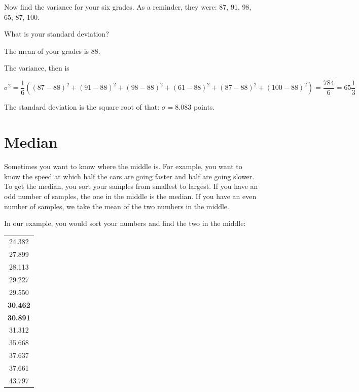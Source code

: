 \begin{Exercise}[title={Variance of Grades}, label=grades_variance]

  Now find the variance for your six grades. As a reminder, they were: 87, 91, 98, 65, 87, 100.

  What is your standard deviation?

\end{Exercise}
\begin{Answer}[ref=grades_variance]

  The mean of your grades is $88$.

  The variance, then is

  $$\sigma^2 = \frac{1}{6} \left((87 - 88)^2 + (91 - 88)^2 + (98 - 88)^2 + (61 - 88)^2 + (87 - 88)^2 + (100 - 88)^2 \right) = \frac{784}{6} = 65 \frac{1}{3}$$

  The standard deviation is the square root of that: $\sigma = 8.083$ points.
  
\end{Answer}


\section{Median}

Sometimes you want to know where the middle is. For example, you want
to know the speed at which half the cars are going faster and half are
going slower. To get the median, you sort your samples from smallest
to largest. If you have an odd number of samples, the one in the
middle is the median. If you have an even number of samples, we take
the mean of the two numbers in the middle.

In our example, you would sort your numbers and find the two in the middle:

\begin{tabular}{c}
24.382\\
27.899\\
28.113\\
29.227\\
29.550\\
\hline
\textbf{30.462}\\
\textbf{30.891}\\
\hline 
31.312\\
35.668\\
37.637\\
37.661\\
43.797\\
\end{tabular}

